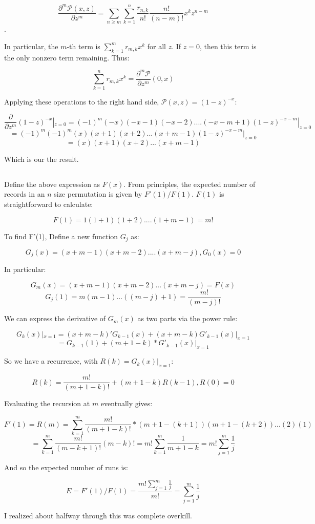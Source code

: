 \documentclass{article}
\begin{document}
$$\frac{\partial^m \mathcal P(x,z)}{\partial z^m} = \sum_{n \ge m} \sum_{k = 1}^{n} \frac{r_{n,k}}{n!}\frac{n!}{(n-m)!}x^kz^{n-m}$$. 

In particular, the $m$-th term is $\sum_{k = 1}^{m}r_{m,k} x^k$ for all $z$. If $z = 0$, then this term is the only nonzero term remaining. Thus:

$$\sum_{k = 1}^{n}r_{m,k} x^k = \frac{\partial^m \mathcal P}{\partial z^m}(0,x) $$

Applying these operations to the right hand side, $\mathcal P(x,z) = (1-z)^{-x}$:

$$\frac{\partial}{\partial z^m} (1-z)^{-x}|_{z = 0} = (-1)^m(-x)(-x-1)(-x-2)....(-x - m + 1)(1-z)^{-x-m}|_{z = 0}$$
$$= (-1)^m(-1)^m(x)(x+1)(x+2)...(x + m -1)(1-z)^{-x-m}|_{z = 0}$$
$$= (x)(x+1)(x+2)...(x + m -1)$$

Which is our the result.

\subsection{}

Define the above expression as $F(x)$. From principles, the expected number of records in an $n$ size permutation is given by $F'(1)/F(1)$. $F(1)$ is straightforward to calculate:

$$F(1) = 1(1+1)(1 + 2)....(1 + m - 1) = m!$$

To find F'(1), Define a new function $G_j$ as:

$$G_j(x) = (x+m-1)(x+m-2)....(x+m-j), G_0(x) = 0$$

In particular:

$$G_m(x) = (x+m-1)(x+m-2)...(x+m-j) = F(x)$$ 
$$G_j(1) = m(m-1)...( (m-j)+1) = \frac{m!}{(m-j)!}$$

We can express the derivative of $G_m(x)$ as two parts via the power rule:

$$G_k(x)|_{x = 1} = (x+m-k)' G_{k-1}(x) + (x+m-k)G'_{k-1}(x)|_{x = 1}$$
$$= G_{k-1}(1) + (m+1-k)*G'_{k-1}(x)|_{x = 1}$$

So we have a recurrence, with $R(k) = G_{k}(x)|_{x = 1}$:

$$R(k) = \frac{m!}{(m+1-k)!} + (m+1-k)R(k-1),   R(0) = 0$$

Evaluating the recursion at $m$ eventually gives:

$$F'(1) = R(m) = \sum_{k = 1}^{m} \frac{m!}{(m+1-k)!}*(m+1-(k+1))(m+1-(k+2))...(2)(1)$$
$$= \sum_{k = 1}^{m} \frac{m!}{(m-k+1)!}(m-k)! = m!\sum_{k = 1}^{m}\frac{1}{m+1-k} = m!\sum_{j = 1}^{m}\frac{1}{j}$$

And so the expected number of runs is:

$$E = F'(1)/F(1) = \frac{m!\sum_{j = 1}^{m}\frac{1}{j}}{m!} = \sum_{j = 1}^{m}\frac{1}{j} $$

I realized about halfway through this was complete overkill. 
\end{document}
